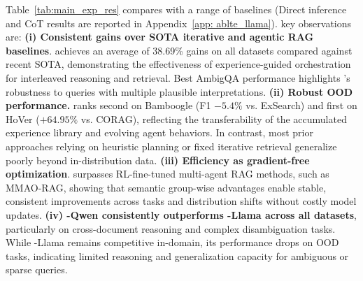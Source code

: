 \vspace{-8pt}

Table~\ref{tab:main_exp_res} compares \hero with a range of baselines (Direct inference and CoT results are reported in Appendix~\ref{app: ablte_llama}).  key observations are: \textbf{(i) Consistent gains over SOTA iterative and agentic RAG baselines}. \hero achieves an average of 38.69\% gains on all datasets compared against recent SOTA, demonstrating the effectiveness of experience-guided orchestration for interleaved reasoning and retrieval. Best AmbigQA performance highlights \hero’s robustness to queries with multiple plausible interpretations. \textbf{(ii) Robust OOD performance.} \hero ranks second on Bamboogle (F1 $-5.4\%$ vs. ExSearch) and first on HoVer ($+64.95\%$ vs. CORAG), reflecting the transferability of the accumulated experience library and evolving agent behaviors. In contrast, most prior approaches relying on heuristic planning or fixed iterative retrieval generalize poorly beyond in-distribution data. \textbf{(iii) Efficiency as gradient-free optimization}. \hero surpasses RL-fine-tuned multi-agent RAG methods, such as MMAO-RAG, showing that semantic group-wise advantages enable stable, consistent improvements across tasks and distribution shifts without costly model updates. \textbf{(iv) \hero-Qwen consistently outperforms \hero-Llama across all datasets}, particularly on cross-document reasoning and complex disambiguation tasks. While \hero-Llama remains competitive in-domain, its performance drops on OOD tasks, indicating limited reasoning and generalization capacity for ambiguous or sparse queries.


